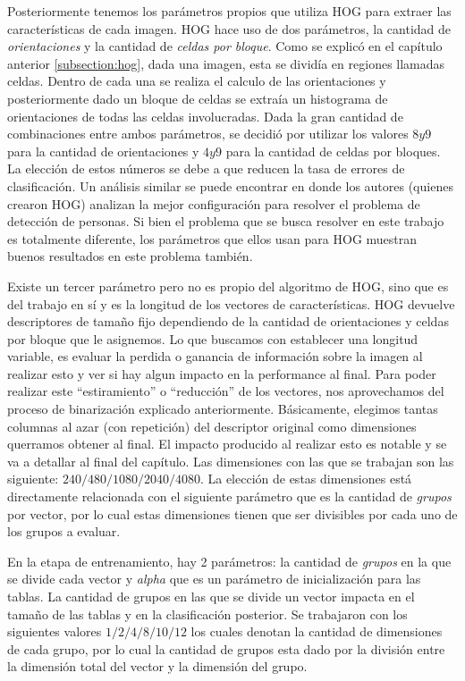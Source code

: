 	Posteriormente tenemos los parámetros propios que utiliza HOG para extraer las características de cada imagen. HOG hace uso de dos parámetros, la cantidad de \textit{orientaciones} y la cantidad de \textit{celdas por bloque}. Como se explicó en el capítulo anterior \ref{subsection:hog}, dada una imagen, esta se dividía en regiones llamadas celdas. Dentro de cada una se realiza el calculo de las orientaciones y posteriormente dado un bloque de celdas se extraía un histograma de orientaciones de todas las celdas involucradas. Dada la gran cantidad de combinaciones entre ambos parámetros, se decidió por utilizar los valores $8 y 9$ para la cantidad de orientaciones y $4 y 9$ para la cantidad de celdas por bloques. La elección de estos números se debe a que reducen la tasa de errores de clasificación. Un análisis similar se puede encontrar en \cite{DT05} donde los autores (quienes crearon HOG) analizan la mejor configuración para resolver el problema de detección de personas. Si bien el problema que se busca resolver en este trabajo es totalmente diferente, los parámetros que ellos usan para HOG muestran buenos resultados en este problema también.
	
	Existe un tercer parámetro pero no es propio del algoritmo de HOG, sino que es del trabajo en sí y es la longitud de los vectores de características. HOG devuelve descriptores de tamaño fijo dependiendo de la cantidad de orientaciones y celdas por bloque que le asignemos. Lo que buscamos con establecer una longitud variable, es evaluar la perdida o ganancia de información sobre la imagen al realizar esto y ver si hay algun impacto en la performance al final. Para poder realizar este ``estiramiento'' o ``reducción'' de los vectores, nos aprovechamos del proceso de binarización explicado anteriormente. Básicamente, elegimos tantas columnas al azar (con repetición) del descriptor original como dimensiones querramos obtener al final. El impacto producido al realizar esto es notable y se va a detallar al final del capítulo. Las dimensiones con las que se trabajan son las siguiente: $240/480/1080/2040/4080$. La elección de estas dimensiones está directamente relacionada con el siguiente parámetro que es la cantidad de \textit{grupos} por vector, por lo cual estas dimensiones tienen que ser divisibles por cada uno de los grupos a evaluar.
	
	En la etapa de entrenamiento, hay 2 parámetros: la cantidad de \textit{grupos} en la que se divide cada vector y \textit{alpha} que es un parámetro de inicialización para las tablas. La cantidad de grupos en las que se divide un vector impacta en el tamaño de las tablas y en la clasificación posterior. Se trabajaron con los siguientes valores $1/2/4/8/10/12$ los cuales denotan la cantidad de dimensiones de cada grupo, por lo cual  la cantidad de grupos esta dado por la división entre la dimensión total del vector y la dimensión del grupo.
	
